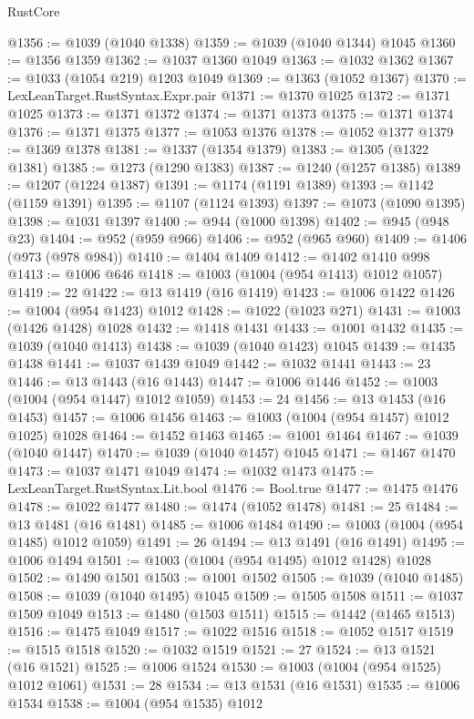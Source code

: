 \begin{lexlean}{RustCore}
\begin{coremodule}
@1356 := @1039 (@1040 @1338)
@1359 := @1039 (@1040 @1344) @1045
@1360 := @1356 @1359
@1362 := @1037 @1360 @1049
@1363 := @1032 @1362
@1367 := @1033 (@1054 @219) @1203 @1049
@1369 := @1363 (@1052 @1367)
@1370 := LexLeanTarget.RustSyntax.Expr.pair
@1371 := @1370 @1025
@1372 := @1371 @1025
@1373 := @1371 @1372
@1374 := @1371 @1373
@1375 := @1371 @1374
@1376 := @1371 @1375
@1377 := @1053 @1376
@1378 := @1052 @1377
@1379 := @1369 @1378
@1381 := @1337 (@1354 @1379)
@1383 := @1305 (@1322 @1381)
@1385 := @1273 (@1290 @1383)
@1387 := @1240 (@1257 @1385)
@1389 := @1207 (@1224 @1387)
@1391 := @1174 (@1191 @1389)
@1393 := @1142 (@1159 @1391)
@1395 := @1107 (@1124 @1393)
@1397 := @1073 (@1090 @1395)
@1398 := @1031 @1397
@1400 := @944 (@1000 @1398)
@1402 := @945 (@948 @23)
@1404 := @952 (@959 @966)
@1406 := @952 (@965 @960)
@1409 := @1406 (@973 (@978 @984))
@1410 := @1404 @1409
@1412 := @1402 @1410 @998
@1413 := @1006 @646
@1418 := @1003 (@1004 (@954 @1413) @1012 @1057)
@1419 := 22
@1422 := @13 @1419 (@16 @1419)
@1423 := @1006 @1422
@1426 := @1004 (@954 @1423) @1012
@1428 := @1022 (@1023 @271)
@1431 := @1003 (@1426 @1428) @1028
@1432 := @1418 @1431
@1433 := @1001 @1432
@1435 := @1039 (@1040 @1413)
@1438 := @1039 (@1040 @1423) @1045
@1439 := @1435 @1438
@1441 := @1037 @1439 @1049
@1442 := @1032 @1441
@1443 := 23
@1446 := @13 @1443 (@16 @1443)
@1447 := @1006 @1446
@1452 := @1003 (@1004 (@954 @1447) @1012 @1059)
@1453 := 24
@1456 := @13 @1453 (@16 @1453)
@1457 := @1006 @1456
@1463 := @1003 (@1004 (@954 @1457) @1012 @1025) @1028
@1464 := @1452 @1463
@1465 := @1001 @1464
@1467 := @1039 (@1040 @1447)
@1470 := @1039 (@1040 @1457) @1045
@1471 := @1467 @1470
@1473 := @1037 @1471 @1049
@1474 := @1032 @1473
@1475 := LexLeanTarget.RustSyntax.Lit.bool
@1476 := Bool.true
@1477 := @1475 @1476
@1478 := @1022 @1477
@1480 := @1474 (@1052 @1478)
@1481 := 25
@1484 := @13 @1481 (@16 @1481)
@1485 := @1006 @1484
@1490 := @1003 (@1004 (@954 @1485) @1012 @1059)
@1491 := 26
@1494 := @13 @1491 (@16 @1491)
@1495 := @1006 @1494
@1501 := @1003 (@1004 (@954 @1495) @1012 @1428) @1028
@1502 := @1490 @1501
@1503 := @1001 @1502
@1505 := @1039 (@1040 @1485)
@1508 := @1039 (@1040 @1495) @1045
@1509 := @1505 @1508
@1511 := @1037 @1509 @1049
@1513 := @1480 (@1503 @1511)
@1515 := @1442 (@1465 @1513)
@1516 := @1475 @1049
@1517 := @1022 @1516
@1518 := @1052 @1517
@1519 := @1515 @1518
@1520 := @1032 @1519
@1521 := 27
@1524 := @13 @1521 (@16 @1521)
@1525 := @1006 @1524
@1530 := @1003 (@1004 (@954 @1525) @1012 @1061)
@1531 := 28
@1534 := @13 @1531 (@16 @1531)
@1535 := @1006 @1534
@1538 := @1004 (@954 @1535) @1012

\end{coremodule}
\end{lexlean}
